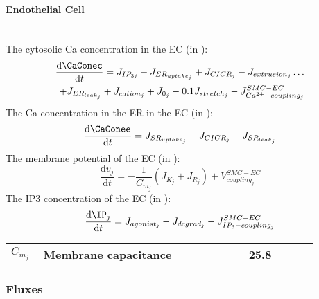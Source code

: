 \paragraph{Endothelial Cell}~\\
%
The cytosolic \gls{Ca} concentration in the \gls{EC} (in \uM):
\begin{equation} \label{eq:cj}
\begin{split}
\dfrac{\mathrm{d}\CaConec}{\mathrm{d}t} = J_{IP_{3j}} - J_{ER_{uptake_{j}}} + J_{CICR_{j}} - J_{extrusion_{j}}\dots \\
 + J_{ER_{leak_{j}}} + J_{cation_{j}} + J_{0_{j}}- 0.1J_{stretch_{j}} - J_{Ca^{2+}-coupling_{j}}^{SMC-EC}
\end{split}
\end{equation}
%
The \gls{Ca} concentration in the \gls{ER} in the \gls{EC} (in \uM): %
\begin{equation} \label{eq:sj}
\dfrac{\mathrm{d}\CaConee}{\mathrm{d}t} =  J_{SR_{uptake_{j}}} - J_{CICR_{j}} - J_{SR_{leak_{j}}}
\end{equation}
%
The membrane potential of the \gls{EC} (in \mV):
\begin{equation} \label{eq:dvjdt}
\dfrac{\mathrm{d}v_{j}}{\mathrm{d}t} =-\frac{1}{C_{m_{j}}} ( J_{K_{j}}+J_{R_{j}}) + V^{SMC-EC}_{coupling_{j}}
\end{equation}
%
The \gls{IP3} concentration of the \gls{EC} (in \uM):
\begin{equation} \label{eq:dIjdt}
\dfrac{\mathrm{d}\IP_{j}}{\mathrm{d}t} =  J_{agonist_{j}}- J_{degrad_{j}}  - J^{SMC-EC}_{IP_{3}-coupling_{j}}
\end{equation}

\begin{table}[h!]
\centering
\begin{tabular}{| p{0.09\linewidth} | >{\footnotesize} p{0.6\linewidth} | >{\footnotesize} p{0.17\linewidth} | >{\footnotesize} p{0.02\linewidth} |}
\arrayrulecolor{lightgrey}\hline
 $C_{m_{j}}$				& Membrane capacitance												& 25.8  \pF		& \cite{Koenigsberger2006} \\
 
\hline
\end{tabular}
\label{tab:JSRuptakei}
\end{table}

\subsubsection{Fluxes}
%
